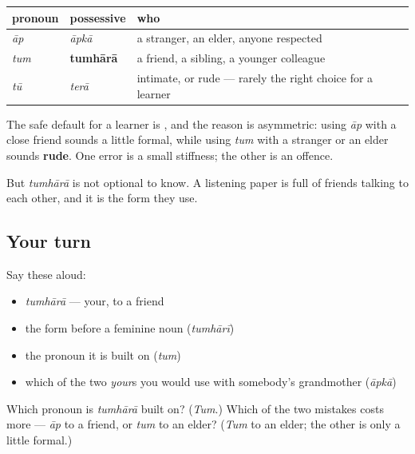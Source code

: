 \begin{grammarlens}[title={Grammar Lens: three levels, and the possessive that goes with each}]
\noindent
\begin{tabularx}{\linewidth}{@{}>{\raggedright\arraybackslash}X>{\raggedright\arraybackslash}X>{\raggedright\arraybackslash}X@{}}
\toprule
\textbf{pronoun} & \textbf{possessive} & \textbf{who} \\
\midrule
\hi{आप} \emph{āp} & \emph{āpkā} & a stranger, an elder, anyone respected \\
\hi{तुम} \emph{tum} & \textbf{tumhārā} & a friend, a sibling, a younger colleague \\
\hi{तू} \emph{tū} & \emph{terā} & intimate, or rude — rarely the right choice for a learner \\
\bottomrule
\end{tabularx}

The safe default for a learner is \textbf{}, and the reason is asymmetric: using \emph{āp} with a close friend sounds a little formal, while using \emph{tum} with a stranger or an elder sounds \textbf{rude}. One error is a small stiffness; the other is an offence.

But \emph{tumhārā} is not optional to know. A listening paper is full of friends talking to each other, and it is the form they use.
\end{grammarlens}

\subsection*{Your turn}
Say these aloud:

\begin{itemize}
\raggedright
  \item \emph{tumhārā} — your, to a friend
  \item the form before a feminine noun (\emph{tumhārī})
  \item the pronoun it is built on (\emph{tum})
  \item which of the two \emph{your}s you would use with somebody's grandmother (\emph{āpkā})
\end{itemize}

\begin{tcolorbox}[breakable,colback=teal!4,colframe=teal!35!black,title={Before you move on}]
Which pronoun is \emph{tumhārā} built on? (\emph{Tum}.) Which of the two mistakes costs more — \emph{āp} to a friend, or \emph{tum} to an elder? (\emph{Tum} to an elder; the other is only a little formal.)
\end{tcolorbox}
